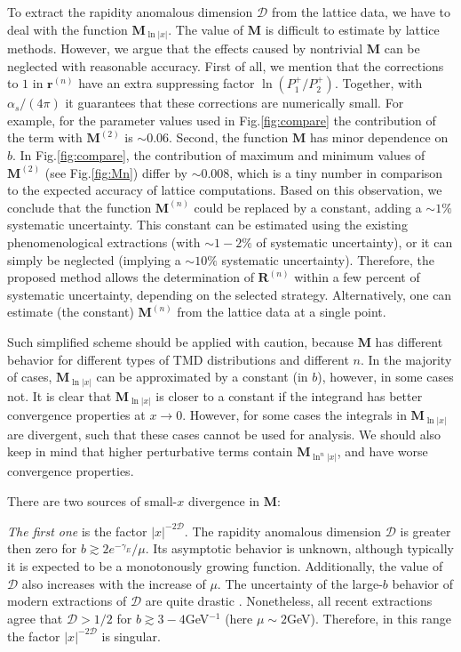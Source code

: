 \documentclass[a4paper, amsfonts, amssymb, amsmath, reprint, showkeys, nofootinbib, twoside]{revtex4-1}
\renewcommand{\(}{\left(}
\renewcommand{\)}{\right)}
\renewcommand{\[}{\left[}
\renewcommand{\]}{\right]}
\begin{document}
To extract the rapidity anomalous dimension $\mathcal{D}$ from the lattice data, we have to deal with the function $\mathbf{M}_{\ln|x|}$. The value of $\mathbf{M}$ is difficult to estimate by lattice methods. However, we argue that the effects caused by nontrivial $\mathbf{M}$ can be neglected with reasonable accuracy. First of all, we mention that the corrections to $1$ in $\mathbf{r}^{(n)}$ have an extra suppressing factor $\ln(P_1^+/P_2^+)$. Together, with $\alpha_s/(4\pi)$ it guarantees that these corrections are numerically small. For example, for the parameter values used in Fig.\ref{fig:compare} the contribution of the term with $\mathbf{M}^{(2)}$ is $\sim 0.06$. Second, the function $\mathbf{M}$ has minor dependence on $b$. In Fig.\ref{fig:compare}, the contribution of maximum and minimum values of $\mathbf{M}^{(2)}$ (see Fig.\ref{fig:Mn}) differ by $\sim 0.008$, which is a tiny number in comparison to the expected accuracy of lattice computations. Based on this observation, we conclude that the function $\mathbf{M}^{(n)}$ could be replaced by a constant, adding a $\sim1\%$ systematic uncertainty. This constant can be estimated using the existing phenomenological extractions (with $\sim 1-2\%$ of systematic uncertainty), or it can simply be neglected (implying a $\sim 10\%$ systematic uncertainty). Therefore, the proposed method allows the determination of $\mathbf{R}^{(n)}$ within a few percent of systematic uncertainty, depending on the selected strategy. Alternatively, one can estimate (the constant) $\mathbf{M}^{(n)}$ from the lattice data at a single point.

Such simplified scheme should be applied with caution, because $\mathbf{M}$ has different behavior for different types of TMD distributions and different $n$. In the majority of cases, $\mathbf{M}_{\ln|x|}$ can be approximated by a constant (in $b$), however, in some cases not. It is clear that $\mathbf{M}_{\ln|x|}$ is closer to a constant if the integrand has better convergence properties at $x\to0$. However, for some cases the integrals in $\mathbf{M}_{\ln|x|}$ are divergent, such that these cases cannot be used for analysis. We should also keep in mind that higher perturbative terms contain $\mathbf{M}_{\ln^n|x|}$, and have worse convergence properties.

There are two sources of small-$x$ divergence in $\mathbf{M}$:

\textit{The first one} is the factor $|x|^{-2\mathcal{D}}$. The rapidity anomalous dimension $\mathcal{D}$ is greater then zero for $b\gtrsim 2e^{-\gamma_E}/\mu$. Its asymptotic behavior is unknown, although typically it is expected to be a monotonously growing function. Additionally, the value of $\mathcal{D}$ also increases with the increase of $\mu$. The uncertainty  of the large-$b$ behavior of modern extractions of $\mathcal{D}$ are quite drastic \cite{Bertone:2019nxa,Scimemi:2019cmh,Bacchetta:2019sam,Vladimirov:2020umg}. Nonetheless, all recent extractions agree that $\mathcal{D}>1/2$ for $b\gtrsim 3-4$GeV$^{-1}$ (here $\mu \sim 2$GeV). Therefore, in this range the factor $|x|^{-2\mathcal{D}}$ is singular.
\end{document}
